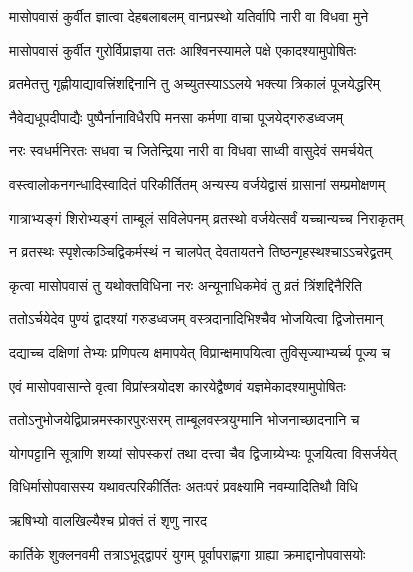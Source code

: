 \twolineshloka
{मासोपवासं कुर्वीत ज्ञात्वा देहबलाबलम्}
{वानप्रस्थो यतिर्वापि नारी वा विधवा मुने} %

\twolineshloka
{मासोपवासं कुर्वीत गुरोर्विप्राज्ञया ततः}
{आश्विनस्यामले पक्षे एकादश्यामुपोषितः} %

\twolineshloka
{व्रतमेतत्तु गृह्णीयाद्यावत्त्रिंशद्दिनानि तु}
{अच्युतस्याऽऽलये भक्त्या त्रिकालं पूजयेद्धरिम्} %

\twolineshloka
{नैवेद्यधूपदीपाद्यैः पुष्पैर्नानाविधैरपि}
{मनसा कर्मणा वाचा पूजयेद्गरुडध्वजम्} %

\twolineshloka
{नरः स्वधर्मनिरतः सधवा च जितेन्द्रिया}
{नारी वा विधवा साध्वी वासुदेवं समर्चयेत्} %

\twolineshloka
{वस्त्वालोकनगन्धादिस्वादितं परिकीर्तितम्}
{अन्यस्य वर्जयेद्वासं ग्रासानां सम्प्रमोक्षणम्} %

\twolineshloka
{गात्राभ्यङ्गं शिरोभ्यङ्गं ताम्बूलं सविलेपनम्}
{व्रतस्थो वर्जयेत्सर्वं यच्चान्यच्च निराकृतम्} %

\twolineshloka
{न व्रतस्थः स्पृशेत्कञ्चिद्विकर्मस्थं न चालपेत्}
{देवतायतने तिष्ठन्गृहस्थश्चाऽऽचरेद्व्रतम्} %

\twolineshloka
{कृत्वा मासोपवासं तु यथोक्तविधिना नरः}
{अन्यूनाधिकमेवं तु व्रतं त्रिंशद्दिनैरिति} %

\twolineshloka
{ततोऽर्चयेदेव पुण्यं द्वादश्यां गरुडध्वजम्}
{वस्त्रदानादिभिश्चैव भोजयित्वा द्विजोत्तमान्} %

\twolineshloka
{दद्याच्च दक्षिणां तेभ्यः प्रणिपत्य क्षमापयेत्}
{विप्रान्क्षमापयित्वा तुविसृज्याभ्यर्च्य पूज्य च} %

\twolineshloka
{एवं मासोपवासान्ते वृत्वा विप्रांस्त्रयोदश}
{कारयेद्वैष्णवं यज्ञमेकादश्यामुपोषितः} %

\twolineshloka
{ततोऽनुभोजयेद्विप्रान्नमस्कारपुरःसरम्}
{ताम्बूलवस्त्रयुग्मानि भोजनाच्छादनानि च} %

\twolineshloka
{योगपट्टानि सूत्राणि शय्यां सोपस्करां तथा}
{दत्त्वा चैव द्विजाग्र्येभ्यः पूजयित्वा विसर्जयेत्} %

\twolineshloka
{विधिर्मासोपवासस्य यथावत्परिकीर्तितः}
{अतःपरं प्रवक्ष्यामि नवम्यादितिथौ विधि} %


\onelineshloka
{ऋषिभ्यो वालखिल्यैश्च प्रोक्तं तं शृणु नारद} %





\twolineshloka
{कार्तिके शुक्लनवमी तत्राऽभूद्द्वापरं युगम्}
{पूर्वापराह्णगा ग्राह्या क्रमाद्दानोपवासयोः} %

